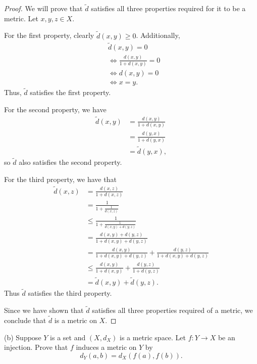 \documentclass{article}
\begin{document}
\begin{proof}

We will prove that $\tilde{d}$ satisfies all three properties required
for it to be a metric. Let $x, y, z \in X$.

For the first property, clearly $\tilde{d}(x, y) \geq 0$. Additionally,
%
\begin{align*}
    &\tilde{d}(x, y) = 0 \\
    &\iff \frac{d(x,y)}{1 + d(x,y)} = 0 \\
    &\iff d(x,y) = 0 \\
    &\iff x = y
    .
\end{align*}
%
Thus, $\tilde{d}$ satisfies the first property.

For the second property, we have
%
\begin{align*}
    \tilde{d}(x, y)
        &= \frac{d(x,y)}{1 + d(x,y)} \\
        &= \frac{d(y,x)}{1 + d(y,x)} \\
        &= \tilde{d}(y, x)
    ,
\end{align*}
%
so $\tilde{d}$ also satisfies the second property.

For the third property, we have that
%
\begin{align*}
    \tilde{d}(x, z)
        &= \frac{d(x,z)}{1 + d(x,z)} \\
        &= \frac{1}{1 + \frac{1}{d(x,z)}} \\
        &\leq \frac{1}{1 + \frac{1}{d(x,y) + d(y,z)}} \\
        &= \frac{d(x,y) + d(y, z)}{1 + d(x,y) + d(y,z)} \\
        &= \frac{d(x,y)}{1 + d(x,y) + d(y,z)} + \frac{d(y, z)}{1 + d(x,y) + d(y,z)} \\
        &\leq \frac{d(x,y)}{1 + d(x,y)} + \frac{d(y, z)}{1 + d(y,z)} \\
        &= \tilde{d}(x, y) + \tilde{d}(y, z)
        .
\end{align*}
%
Thus $\tilde{d}$ satisfies the third property.

Since we have shown that $\tilde{d}$ satisfies all three properties
required of a metric, we conclude that $\tilde{d}$ is a metric on $X$.

\end{proof}

(b) Suppose $Y$ is a set and $(X, d_X)$ is a metric space. Let $f: Y \to
X$ be an injection. Prove that $f$ induces a metric on $Y$ by
%
\begin{equation*}
    d_Y (a, b) = d_X(f(a), f(b))
    .
\end{equation*}
\end{document}
